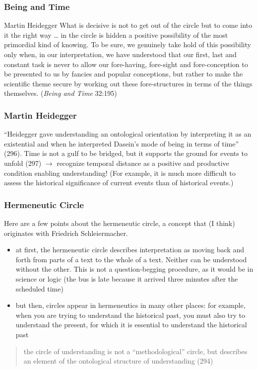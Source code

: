 \documentclass[xcolor=dvipsnames]{beamer}
\begin{document}
\begin{frame}
  \frametitle{Being and Time}
  \begin{block}{Martin Heidegger}
    What is decisive is not to get out of the circle but to come into
    it the right way {\ldots} in the circle is hidden a positive
    possibility of the most primordial kind of knowing. To be sure, we
    genuinely take hold of this possibility only when, in our
    interpretation, we have understood that our first, last and
    constant task is never to allow our fore-having, fore-sight and
    fore-conception to be presented to us by fancies and popular
    conceptions, but rather to make the scientific theme secure by
    working out these fore-structures in terms of the things
    themselves. (\emph{Being and Time} 32:195)
  \end{block}
\end{frame}

\begin{frame}
  \frametitle{Martin Heidegger}
  ``Heidegger gave understanding an ontological orientation by
  interpreting it as an existential and when he interpreted Dasein's
  mode of being in terms of time'' (296). Time is not a gulf to be
  bridged, but it supports the ground for events to unfold (297)
  $\longrightarrow$ recognize temporal distance as a positive and
  productive condition enabling understanding! (For example, it is
  much more difficult to assess the historical significance of current
  events than of historical events.)
\end{frame}

\begin{frame}
  \frametitle{Hermeneutic Circle}
  Here are a few points about the hermeneutic circle, a concept that
  (I think) originates with Friedrich Schleiermacher.
  \begin{itemize}
  \item at first, the hermeneutic circle describes interpretation as
    moving back and forth from parts of a text to the whole of a text.
    Neither can be understood without the other. This is not a
    question-begging procedure, as it would be in science or logic
    (the bus is late because it arrived three minutes after the
    scheduled time)
  \item but then, circles appear in hermeneutics in many other places:
    for example, when you are trying to understand the historical
    past, you must also try to understand the present, for which it is
    essential to understand the historical past
  \end{itemize}
  \begin{quote}
    the circle of understanding is not a ``methodological'' circle,
    but describes an element of the ontological structure of
    understanding (294)
  \end{quote}
\end{frame}
\end{document}
